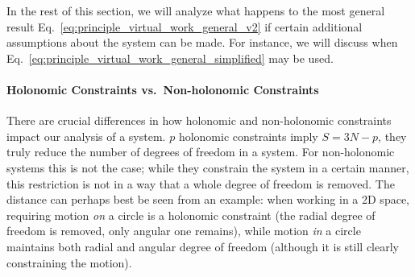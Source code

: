 \documentclass[../class_mech_main.tex]{subfiles}
\begin{document}



In the rest of this section, we will analyze what happens to the most general result Eq.~\eqref{eq:principle_virtual_work_general_v2} if certain additional assumptions about the system can be made. For instance, we will discuss when Eq.~\eqref{eq:principle_virtual_work_general_simplified} may be used.



			\paragraph{Holonomic Constraints vs.~Non-holonomic Constraints}
There are crucial differences in how holonomic and non-holonomic constraints impact our analysis of a system. $p$ holonomic constraints imply $S = 3N - p$, they truly reduce the number of degrees of freedom in a system. For non-holonomic systems this is not the case; while they constrain the system in a certain manner, this restriction is not in a way that a whole degree of freedom is removed. The distance can perhaps best be seen from an example: when working in a 2D space, requiring motion \emph{on} a circle is a holonomic constraint (the radial degree of freedom is removed, only angular one remains), while motion \emph{in} a circle maintains both radial and angular degree of freedom (although it is still clearly constraining the motion).
\end{document}
